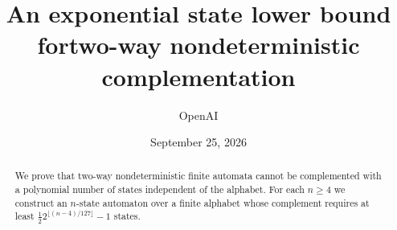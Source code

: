 \documentclass[11pt]{article}
\title{An exponential state lower bound for\newline two-way nondeterministic complementation}
\author{OpenAI}
\date{September 25, 2026}
\theoremstyle{definition}
\theoremstyle{remark}
\numberwithin{equation}{section}
\begin{document}
\maketitle
\begin{abstract}
We prove that two-way nondeterministic finite automata cannot be
complemented with a polynomial number of states independent of the
alphabet. For each $n\ge4$ we construct an $n$-state automaton over a finite
alphabet whose complement requires at least
$\tfrac12 2^{\lfloor(n-4)/127\rfloor}-1$ states.
\end{abstract}





{\raggedright


}
\end{document}
